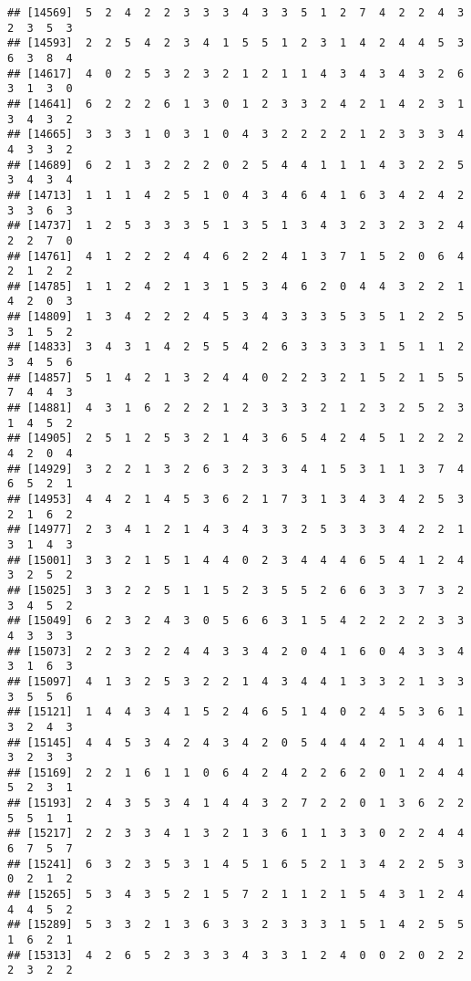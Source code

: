 \documentclass[
]{article}
\begin{document}
\begin{verbatim}
## [14569]  5  2  4  2  2  3  3  3  4  3  3  5  1  2  7  4  2  2  4  3  2  3  5  3
## [14593]  2  2  5  4  2  3  4  1  5  5  1  2  3  1  4  2  4  4  5  3  6  3  8  4
## [14617]  4  0  2  5  3  2  3  2  1  2  1  1  4  3  4  3  4  3  2  6  3  1  3  0
## [14641]  6  2  2  2  6  1  3  0  1  2  3  3  2  4  2  1  4  2  3  1  3  4  3  2
## [14665]  3  3  3  1  0  3  1  0  4  3  2  2  2  2  1  2  3  3  3  4  4  3  3  2
## [14689]  6  2  1  3  2  2  2  0  2  5  4  4  1  1  1  4  3  2  2  5  3  4  3  4
## [14713]  1  1  1  4  2  5  1  0  4  3  4  6  4  1  6  3  4  2  4  2  3  3  6  3
## [14737]  1  2  5  3  3  3  5  1  3  5  1  3  4  3  2  3  2  3  2  4  2  2  7  0
## [14761]  4  1  2  2  2  4  4  6  2  2  4  1  3  7  1  5  2  0  6  4  2  1  2  2
## [14785]  1  1  2  4  2  1  3  1  5  3  4  6  2  0  4  4  3  2  2  1  4  2  0  3
## [14809]  1  3  4  2  2  2  4  5  3  4  3  3  3  5  3  5  1  2  2  5  3  1  5  2
## [14833]  3  4  3  1  4  2  5  5  4  2  6  3  3  3  3  1  5  1  1  2  3  4  5  6
## [14857]  5  1  4  2  1  3  2  4  4  0  2  2  3  2  1  5  2  1  5  5  7  4  4  3
## [14881]  4  3  1  6  2  2  2  1  2  3  3  3  2  1  2  3  2  5  2  3  1  4  5  2
## [14905]  2  5  1  2  5  3  2  1  4  3  6  5  4  2  4  5  1  2  2  2  4  2  0  4
## [14929]  3  2  2  1  3  2  6  3  2  3  3  4  1  5  3  1  1  3  7  4  6  5  2  1
## [14953]  4  4  2  1  4  5  3  6  2  1  7  3  1  3  4  3  4  2  5  3  2  1  6  2
## [14977]  2  3  4  1  2  1  4  3  4  3  3  2  5  3  3  3  4  2  2  1  3  1  4  3
## [15001]  3  3  2  1  5  1  4  4  0  2  3  4  4  4  6  5  4  1  2  4  3  2  5  2
## [15025]  3  3  2  2  5  1  1  5  2  3  5  5  2  6  6  3  3  7  3  2  3  4  5  2
## [15049]  6  2  3  2  4  3  0  5  6  6  3  1  5  4  2  2  2  2  3  3  4  3  3  3
## [15073]  2  2  3  2  2  4  4  3  3  4  2  0  4  1  6  0  4  3  3  4  3  1  6  3
## [15097]  4  1  3  2  5  3  2  2  1  4  3  4  4  1  3  3  2  1  3  3  3  5  5  6
## [15121]  1  4  4  3  4  1  5  2  4  6  5  1  4  0  2  4  5  3  6  1  3  2  4  3
## [15145]  4  4  5  3  4  2  4  3  4  2  0  5  4  4  4  2  1  4  4  1  3  2  3  3
## [15169]  2  2  1  6  1  1  0  6  4  2  4  2  2  6  2  0  1  2  4  4  5  2  3  1
## [15193]  2  4  3  5  3  4  1  4  4  3  2  7  2  2  0  1  3  6  2  2  5  5  1  1
## [15217]  2  2  3  3  4  1  3  2  1  3  6  1  1  3  3  0  2  2  4  4  6  7  5  7
## [15241]  6  3  2  3  5  3  1  4  5  1  6  5  2  1  3  4  2  2  5  3  0  2  1  2
## [15265]  5  3  4  3  5  2  1  5  7  2  1  1  2  1  5  4  3  1  2  4  4  4  5  2
## [15289]  5  3  3  2  1  3  6  3  3  2  3  3  3  1  5  1  4  2  5  5  1  6  2  1
## [15313]  4  2  6  5  2  3  3  3  4  3  3  1  2  4  0  0  2  0  2  2  2  3  2  2

\end{verbatim}
\end{document}
